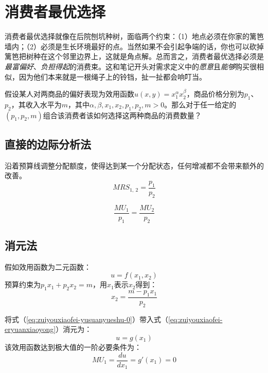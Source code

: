 \chapter{消费者最优选择}
\label{sec:utility-maximization-and-choice}

消费者最优选择就像在后院刨坑种树，面临两个约束：（1）地点必须在你家的篱笆墙内；（2）必须是生长环境最好的点。当然如果不会引起争端的话，你也可以砍掉篱笆把树种在这个邻里边界上，这就是角点解。总而言之，消费者最优选择必须是\emph{最富偏好}、\emph{负担得起}的消费束。这和笔记开头对需求定义中的\emph{愿意}且\emph{能够}购买很相似，因为他们本来就是一根绳子上的铃铛，扯一扯都会响叮当。

假设某人对两商品的偏好表现为效用函数$u(x,y) = x_1^{\alpha} x_2^{\beta}$，商品价格分别为$p_1$、$p_2$，其收入水平为$m$，其中$\alpha, \beta,x_1,x_2,p_1,p_2,m > 0$。那么对于任一给定的$(p_1,p_2,m)$组合该消费者该如何选择这两种商品的消费数量？

\section{直接的边际分析法}
沿着预算线调整分配额度，使得达到某一个分配状态，任何增减都不会带来额外的改善。
\begin{equation}
MRS_{1,~2}=\frac{p_1}{p_2}
\label{eq:zuiyoufenxi-bianjifenxi-mrs}
\end{equation}

\begin{equation}
\frac{MU_1}{p_1}=\frac{MU_2}{p_2}
\label{eq:zuiyoufenxi-bianjifenxi-a}
\end{equation}

\section{消元法}
假如效用函数为二元函数：
\begin{equation}
u=f(x_1,x_2)
\label{eq:zuiyouxiaofei-eryuanxiaoyong}
\end{equation}
预算约束为$p_1 x_1 + p_2 x_2 = m$，用$x_1$表示$x_2$得到：
\begin{equation}
x_2=\frac{m-p_1 x_1}{p_2}
\label{eq:zuiyouxiaofei-yusuanyueshu-0}
\end{equation}

将式（\ref{eq:zuiyouxiaofei-yusuanyueshu-0}）带入式（\ref{eq:zuiyouxiaofei-eryuanxiaoyong}）消元为：
\begin{equation}
u=g(x_1)
\label{eq:zuiyouxiaofei-yiyuanxiaoyong}
\end{equation}
该效用函数达到极大值的一阶必要条件为：
\begin{equation}
MU_1 = \frac{du}{dx_1} = g'(x_1) = 0
\label{eq:zuiyouxiaofei-yiyuanxiaoyong-yijiebiyao}
\end{equation}

